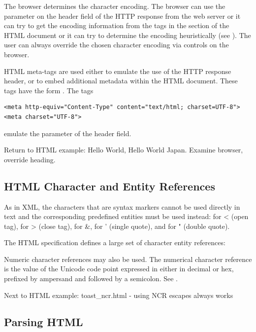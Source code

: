 The browser determines the character encoding.
The browser can use the  parameter on the
 header field of the HTTP response
from the web server or it can try to get the encoding information
from the  tags in the  section of the HTML document
or it can try to determine the encoding heuristically
(see ).
The user can always override the chosen character encoding 
via controls on the browser.

HTML meta-tags are used either to emulate the use of the HTTP response header, 
or to embed additional metadata within the HTML document.
These tags have the form .
The tags
\begin{verbatim}
<meta http-equiv="Content-Type" content="text/html; charset=UTF-8">
<meta charset="UTF-8">
\end{verbatim}
emulate the  parameter of the  header field.

Return to HTML example:  Hello World, Hello World Japan. 
Examine browser, override heading.

\subsection{HTML Character and Entity References}

As in XML, the characters that are syntax markers cannot be used directly
in text and the corresponding predefined entities must be used instead:
 for < (open tag),  for > (close tag),  for \&,
 for ' (single quote), and  for " (double quote).

The HTML specification defines a large set of character entity references:

Numeric character references may also be used.
The numerical character reference is the value of the Unicode code point
expressed in either in decimal or hex, 
prefixed by ampersand and followed by a semicolon.
See .

Next to HTML example:  toast\_ncr.html - using NCR escapes always works

\subsection{Parsing HTML}

